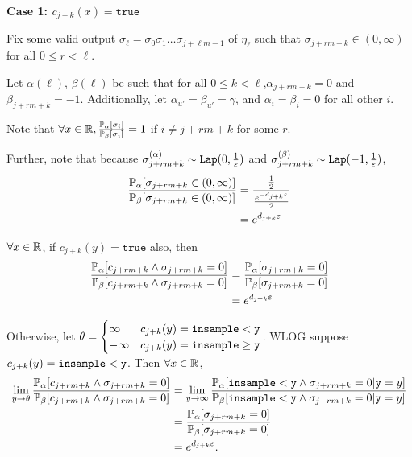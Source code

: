 \textbf{Case 1: $c_{j+k}(x) = \texttt{true}$}

Fix some valid output $\sigma_\ell = \sigma_0\sigma_1\ldots\sigma_{j+\ell m-1}$ of $\eta_\ell$ such that $\sigma_{j+rm+k}\in (0, \infty)$ for all $0\leq r< \ell$. 

Let $\alpha(\ell)$, $\beta(\ell)$ be such that for all $0\leq k < \ell$,$\alpha_{j+rm+k}=0$ and $ \beta_{j+rm+k} = -1$. Additionally, let $\alpha_{u'} = \beta_{u'} = \gamma$, and $\alpha_i=\beta_i=0$ for all other $i$. 

Note that $\forall x\in \RR, \frac{\PP_\alpha[\sigma_{i}]}{\PP_\beta[\sigma_i]} = 1$ if $i\neq j+rm+k$ for some $r$. 

Further, note that because $\sigma_{j+rm+k}^{(\alpha)}\sim \Lap(0, \frac{1}{\varepsilon})$ and $\sigma_{j+rm+k}^{(\beta)}\sim \Lap(-1, \frac{1}{\varepsilon})$, \begin{align*}
	\frac{\PP_\alpha[\sigma_{j+rm+k}\in (0, \infty)]}{\PP_\beta[\sigma_{j+rm+k}\in (0, \infty)]}&=\frac{\frac{1}{2}}{\frac{e^{-d_{j+k}\varepsilon}}{2}}\\
	&=e^{d_{j+k}\varepsilon}
\end{align*}


$\forall x\in \RR$, if $c_{j+k}(y)=\texttt{true}$ also, then \begin{align*}
	\frac{\PP_\alpha[c_{j+rm+k}\land \sigma_{j+rm+k}=0]}{\PP_\beta[c_{j+rm+k}\land\sigma_{j+rm+k}=0]} &=\frac{\PP_\alpha[\sigma_{j+rm+k}=0]}{\PP_\beta[\sigma_{j+rm+k}=0]} \\
	&=e^{d_{j+k}\varepsilon}
\end{align*}

Otherwise, let $\theta = \begin{cases}
	\infty & c_{j+k}(y)=\lguard[\texttt{y}]\\
	-\infty & c_{j+k}(y)=\gguard[\texttt{y}]
\end{cases}$. WLOG suppose $c_{j+k}(y)=\lguard[\texttt{y}]$. Then $\forall x\in \RR$, \begin{align*}
	\lim_{y\to\theta}\frac{\PP_\alpha[c_{j+rm+k}\land \sigma_{j+rm+k}=0]}{\PP_\beta[c_{j+rm+k}\land\sigma_{j+rm+k}=0]} &=\lim_{y\to\infty}\frac{\PP_\alpha[\lguard[\texttt{y}]\land \sigma_{j+rm+k}=0|\texttt{y}=y]}{\PP_\beta[\lguard[\texttt{y}]\land \sigma_{j+rm+k}=0|\texttt{y}=y]}\\
	&=\frac{\PP_\alpha[\sigma_{j+rm+k}=0]}{\PP_\beta[\sigma_{j+rm+k}=0]}\\
	&= e^{d_{j+k}\varepsilon}.
\end{align*}

